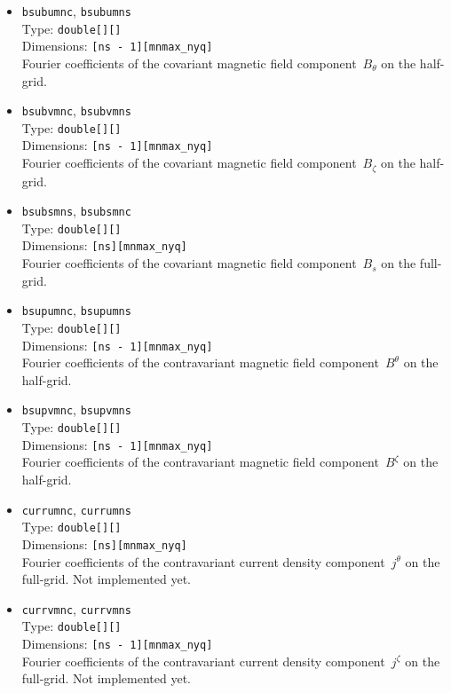 \begin{itemize}
       Dimensions: \texttt{[ns - 1][mnmax\_nyq]} \\
       Fourier coefficients of the magnetic field strength~$\vert\mathbf{B}\vert$ on the half-grid.
 \item \texttt{bsubumnc}, \texttt{bsubumns} \\
       Type: \texttt{double[][]} \\
       Dimensions: \texttt{[ns - 1][mnmax\_nyq]} \\
       Fourier coefficients of the covariant magnetic field component~$B_\theta$ on the half-grid.
 \item \texttt{bsubvmnc}, \texttt{bsubvmns} \\
       Type: \texttt{double[][]} \\
       Dimensions: \texttt{[ns - 1][mnmax\_nyq]} \\
       Fourier coefficients of the covariant magnetic field component~$B_\zeta$ on the half-grid.
 \item \texttt{bsubsmns}, \texttt{bsubsmnc} \\
       Type: \texttt{double[][]} \\
       Dimensions: \texttt{[ns][mnmax\_nyq]} \\
       Fourier coefficients of the covariant magnetic field component~$B_s$ on the full-grid.
 \item \texttt{bsupumnc}, \texttt{bsupumns} \\
       Type: \texttt{double[][]} \\
       Dimensions: \texttt{[ns - 1][mnmax\_nyq]} \\
       Fourier coefficients of the contravariant magnetic field component~$B^\theta$ on the half-grid.
 \item \texttt{bsupvmnc}, \texttt{bsupvmns} \\
       Type: \texttt{double[][]} \\
       Dimensions: \texttt{[ns - 1][mnmax\_nyq]} \\
       Fourier coefficients of the contravariant magnetic field component~$B^\zeta$ on the half-grid.
 \item \texttt{currumnc}, \texttt{currumns} \\
       Type: \texttt{double[][]} \\
       Dimensions: \texttt{[ns][mnmax\_nyq]} \\
       Fourier coefficients of the contravariant current density component~$j^\theta$ on the full-grid.
       Not implemented yet.
 \item \texttt{currvmnc}, \texttt{currvmns} \\
       Type: \texttt{double[][]} \\
       Dimensions: \texttt{[ns - 1][mnmax\_nyq]} \\
       Fourier coefficients of the contravariant current density component~$j^\zeta$ on the full-grid.
       Not implemented yet.
\end{itemize}
